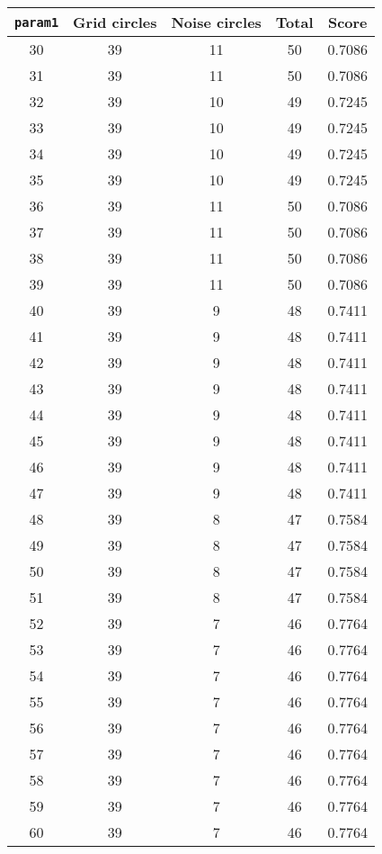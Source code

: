 \documentclass[letterpaper, 12pt]{article}
\begin{document}
\begin{longtable}{|c|c|c|c|c|}
\hline
\textbf{\texttt{param1}} & \textbf{Grid circles} & \textbf{Noise circles} & \textbf{Total} & \textbf{Score} \\
\hline
30 & 39 & 11 & 50 & 0.7086 \\
\hline
31 & 39 & 11 & 50 & 0.7086 \\
\hline
32 & 39 & 10 & 49 & 0.7245 \\
\hline
33 & 39 & 10 & 49 & 0.7245 \\
\hline
34 & 39 & 10 & 49 & 0.7245 \\
\hline
35 & 39 & 10 & 49 & 0.7245 \\
\hline
36 & 39 & 11 & 50 & 0.7086 \\
\hline
37 & 39 & 11 & 50 & 0.7086 \\
\hline
38 & 39 & 11 & 50 & 0.7086 \\
\hline
39 & 39 & 11 & 50 & 0.7086 \\
\hline
40 & 39 & 9 & 48 & 0.7411 \\
\hline
41 & 39 & 9 & 48 & 0.7411 \\
\hline
42 & 39 & 9 & 48 & 0.7411 \\
\hline
43 & 39 & 9 & 48 & 0.7411 \\
\hline
44 & 39 & 9 & 48 & 0.7411 \\
\hline
45 & 39 & 9 & 48 & 0.7411 \\
\hline
46 & 39 & 9 & 48 & 0.7411 \\
\hline
47 & 39 & 9 & 48 & 0.7411 \\
\hline
48 & 39 & 8 & 47 & 0.7584 \\
\hline
49 & 39 & 8 & 47 & 0.7584 \\
\hline
50 & 39 & 8 & 47 & 0.7584 \\
\hline
51 & 39 & 8 & 47 & 0.7584 \\
\hline
52 & 39 & 7 & 46 & 0.7764 \\
\hline
53 & 39 & 7 & 46 & 0.7764 \\
\hline
54 & 39 & 7 & 46 & 0.7764 \\
\hline
55 & 39 & 7 & 46 & 0.7764 \\
\hline
56 & 39 & 7 & 46 & 0.7764 \\
\hline
57 & 39 & 7 & 46 & 0.7764 \\
\hline
58 & 39 & 7 & 46 & 0.7764 \\
\hline
59 & 39 & 7 & 46 & 0.7764 \\
\hline
60 & 39 & 7 & 46 & 0.7764 \\
\hline

\end{longtable}
\end{document}

